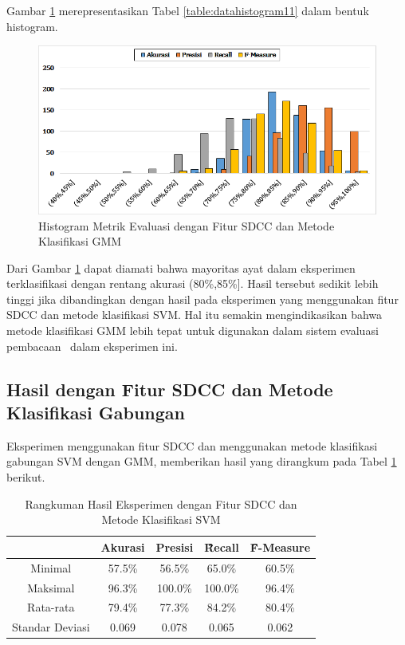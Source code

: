   Gambar \ref{fig:histogram11} merepresentasikan Tabel \ref{table:datahistogram11} dalam bentuk histogram.
  \begin{figure}
    \centering
    \includegraphics[width=\linewidth]{pics/histogram11}
    \caption{Histogram Metrik Evaluasi dengan Fitur SDCC dan Metode Klasifikasi GMM}
    \label{fig:histogram11}
  \end{figure}

  Dari Gambar \ref{fig:histogram11} dapat diamati bahwa mayoritas ayat dalam eksperimen terklasifikasi dengan rentang akurasi (80\%,85\%]. Hasil tersebut sedikit lebih tinggi jika dibandingkan dengan hasil pada eksperimen yang menggunakan fitur SDCC dan metode klasifikasi SVM. Hal itu semakin mengindikasikan bahwa metode klasifikasi GMM lebih tepat untuk digunakan dalam sistem evaluasi pembacaan \quran~dalam eksperimen ini.






  \subsection{Hasil dengan Fitur SDCC dan Metode Klasifikasi Gabungan}
  Eksperimen menggunakan fitur SDCC dan menggunakan metode klasifikasi gabungan SVM dengan GMM, memberikan hasil yang dirangkum pada Tabel \ref{table:sdccgabungan} berikut.

  \begin{table}
    \centering
    \caption{Rangkuman Hasil Eksperimen dengan Fitur SDCC dan Metode Klasifikasi SVM}
    \begin{tabular}{|c|c|c|c|c|}
      \hline
       & Akurasi & Presisi & \f{\f{Recall}} & \f{\f{F-Measure}} \\ \hline
      Minimal         & 57.5\% & 56.5\%  & 65.0\%  & 60.5\% \\ \hline
      Maksimal        & 96.3\% & 100.0\% & 100.0\% & 96.4\% \\ \hline
      Rata-rata       & 79.4\% & 77.3\%  & 84.2\%  & 80.4\% \\ \hline
      Standar Deviasi & 0.069  & 0.078   & 0.065   & 0.062  \\ \hline
    \end{tabular}
    \label{table:sdccgabungan}
  \end{table}

